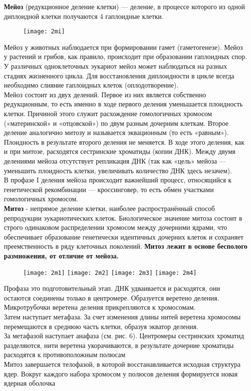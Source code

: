 \textbf{Мейоз} (редукционное деление клетки) — деление, в процессе которого из одной диплоидной клетки получаются 4 гаплоидные клетки.
\begin{figure}[H]
	\texttt{[image: 2mi]}
\end{figure}
Мейоз у животных наблюдается при формировании гамет (гаметогенезе). Мейоз у растений и грибов, как правило, происходит при образовании гаплоидных спор. У различных одноклеточных эукариот мейоз может наблюдаться на разных стадиях жизненного цикла. Для восстановления диплоидности в цикле всегда необходимо слияние гаплоидных клеток (оплодотворение).\\
Мейоз состоит из двух делений. Первое из них является собственно редукционным, то есть именно в ходе первого деления уменьшается плоидность клетки. Причиной этого служит расхождение гомологичных хромосом («материнской» и «отцовской») по двум разным дочерним клеткам. Второе деление аналогично митозу и называется эквационным (то есть «равным»). Плоидность в результате второго деления не меняется. В ходе этого деления, как и при митозе, расходятся сестринские хроматиды (копии ДНК). Между двумя делениями мейоза отсутствует репликация ДНК (так как «цель» мейоза — уменьшить плоидность клетки, увеличивать количество ДНК здесь незачем).\\
В профазе I деления мейоза происходит важнейший процесс, относящийся к генетической рекомбинации — кроссинговер, то есть обмен участками гомологичных хромосом.\\

\textbf{Митоз} - непрямое деление клетки, наиболее распространённый способ репродукции эукариотических клеток. Биологическое значение митоза состоит в строго одинаковом распределении хромосом между дочерними ядрами, что обеспечивает образование генетически идентичных дочерних клеток и сохраняет преемственность в ряду клеточных поколений. \textbf{Митоз лежит в основе бесполого размножения, от отличие от мейоза.}
\begin{figure}[H]
	\centering
	\texttt{[image: 2m1]}
	\texttt{[image: 2m2]}
	\texttt{[image: 2m3]}
	\texttt{[image: 2m4]}
\end{figure}
Профаза это подготовительный этап. ДНК удваивается и расходятся, они остаются соединены только в центромере. Образуется веретено деления. Микротрубочки веретена деления прикрепляются к хромосомам.\\
Затем наступает метафаза. За счет изменения длины нитей веретена хромосомы перемещаются в среднюю часть клетки, образуя экватор деления.\\
За метафазой наступает анафаза (см. рис. 6). Центромеры сестринских хроматид разделяются, нити веретена укорачиваются, в результате дочерние хроматиды расходятся к противоположным полюсам\\
Митоз завершается телофазой, в которой восстанавливается исходная структура ядер. Вокруг каждого набора хромосом у полюсов деления формируется новая ядерная оболочка
